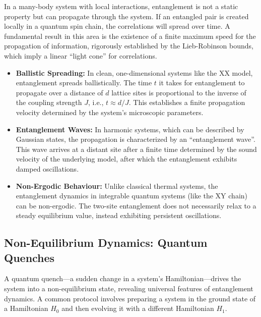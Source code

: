 In a many-body system with local interactions, entanglement is not a static
property but can propagate through the system. If an entangled pair is
created locally in a quantum spin chain, the correlations will spread over
time. A fundamental result in this area is the existence of a finite maximum
speed for the propagation of information, rigorously established by the
Lieb-Robinson bounds, which imply a linear ``light cone'' for
correlations.
\begin{itemize}
	\item \textbf{Ballistic Spreading:} In clean, one-dimensional systems
		like the XX model, entanglement spreads ballistically. The time $t$
		it takes for entanglement to propagate over a distance of $d$ lattice
		sites is proportional to the inverse of the coupling strength $J$,
		i.e., $t \approx d/J$. This establishes a finite propagation velocity
		determined by the system's microscopic parameters.
	\item \textbf{Entanglement Waves:} In harmonic systems, which can be
		described by Gaussian states, the propagation is characterized by an
		``entanglement wave''. This wave arrives at a distant site after a
		finite time determined by the sound velocity of the underlying model,
		after which the entanglement exhibits damped oscillations.
	\item \textbf{Non-Ergodic Behaviour:} Unlike classical thermal systems,
		the entanglement dynamics in integrable quantum systems (like the XY
		chain) can be non-ergodic. The two-site entanglement does not
		necessarily relax to a steady equilibrium value, instead exhibiting
		persistent oscillations.
\end{itemize}

\subsection{Non-Equilibrium Dynamics: Quantum Quenches}
\label{sub:quenches}

A quantum quench---a sudden change in a system's Hamiltonian---drives
the system into a non-equilibrium state, revealing universal features of
entanglement dynamics. A common protocol involves preparing a system in the
ground state of a Hamiltonian $H_0$ and then evolving it with a different
Hamiltonian $H_1$.

